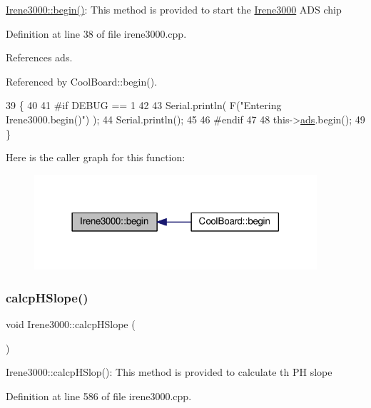 \hyperlink{classIrene3000_ad5891806c500ae1007afe52b9e304c2b}{Irene3000\+::begin()}\+: This method is provided to start the \hyperlink{classIrene3000}{Irene3000} A\+DS chip 

Definition at line 38 of file irene3000.\+cpp.



References ads.



Referenced by Cool\+Board\+::begin().


\begin{DoxyCode}
39 \{
40 
41 \textcolor{preprocessor}{#if DEBUG == 1 }
42 
43     Serial.println( F(\textcolor{stringliteral}{"Entering Irene3000.begin()"}) );
44     Serial.println();
45 
46 \textcolor{preprocessor}{#endif}
47 
48     this->\hyperlink{classIrene3000_a1215e77ba761c9908d80d691f149e135}{ads}.begin();
49 \}
\end{DoxyCode}
Here is the caller graph for this function\+:
\nopagebreak
\begin{figure}[H]
\begin{center}
\leavevmode
\includegraphics[width=297pt]{classIrene3000_ad5891806c500ae1007afe52b9e304c2b_icgraph}
\end{center}
\end{figure}
\mbox{\label{classIrene3000_a81f6a79e546679692053f7ac1af49613}} 
\subsubsection{\texorpdfstring{calcp\+H\+Slope()}{calcpHSlope()}}
{\footnotesize\ttfamily void Irene3000\+::calcp\+H\+Slope (\begin{DoxyParamCaption}{ }\end{DoxyParamCaption})}

Irene3000\+::calcp\+H\+Slop()\+: This method is provided to calculate th PH slope 

Definition at line 586 of file irene3000.\+cpp.



